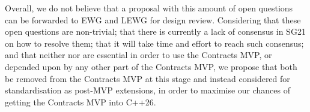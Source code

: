 Overall, we do not believe that a proposal with this amount of open questions can be forwarded to EWG and LEWG for design review. Considering that these open questions are non-trivial; that there is currently a lack of consensus in SG21 on how to resolve them; that it will take time and effort to reach such consensus; and that neither \mbox{} nor \mbox{}  are essential in order to use the Contracts MVP, or depended upon by any other part of the Contracts MVP, we propose that both be removed from the Contracts MVP at this stage and instead considered for standardisation as post-MVP extensions, in order to maximise our chances of getting the Contracts MVP into C++26.





\renewcommand{\bibname}{References}




